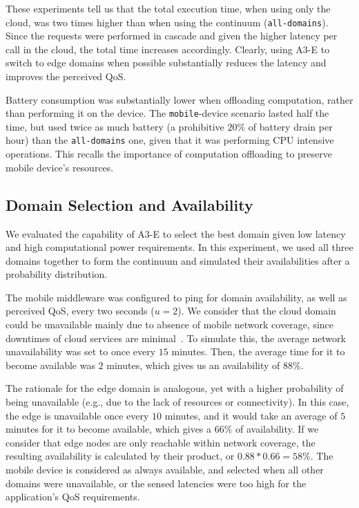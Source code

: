These experiments tell us that the total execution time, when using only the cloud, was two times higher than when using the continuum (\texttt{all-domains}). Since the requests were performed in cascade and given the higher latency per call in the cloud, the total time increases accordingly. Clearly, using A3-E to switch to edge domains when possible substantially reduces the latency and improves the perceived QoS.

Battery consumption was substantially lower when offloading computation, rather than performing it on the device. The \texttt{mobile}-device scenario lasted half the time, but used twice as much battery (a prohibitive $20$\% of battery drain per hour) than the \texttt{all-domains} one, given that it was performing CPU intensive operations. This recalls the importance of computation offloading to preserve mobile device's resources.

\subsection{Domain Selection and Availability}
\label{sub:domain-selection}

We evaluated the capability of A3-E to select the best domain given low latency and high computational power requirements. In this experiment, we used all three domains together to form the continuum and simulated their availabilities after a probability distribution. 

The mobile middleware was configured to ping for domain availability, as well as perceived QoS, every two seconds ($u = 2$). We consider that the cloud domain could be unavailable mainly due to absence of mobile network coverage, since downtimes of cloud services are minimal~\cite{garcia2017bandwidth}. To simulate this, the average network unavailability was set to once every $15$ minutes. Then, the average time for it to become available was $2$ minutes, which gives us an availability of $88\%$.

The rationale for the edge domain is analogous, yet with a higher probability of being unavailable (e.g., due to the lack of resources or connectivity). In this case, the edge is unavailable once every $10$ minutes, and it would take an average of $5$ minutes for it to become available, which gives a $66\%$ of availability. If we consider that edge nodes are only reachable within network coverage, the resulting availability is calculated by their product, or $0.88*0.66=58\%$. The mobile device is considered as always available, and selected when all other domains were unavailable, or the sensed latencies were too high for the application's QoS requirements. 

